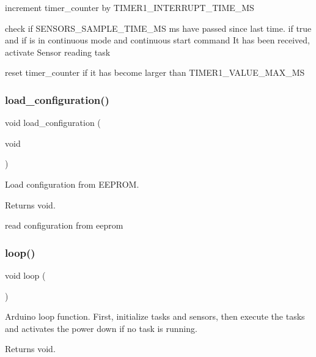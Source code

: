 increment timer\+\_\+counter by T\+I\+M\+E\+R1\+\_\+\+I\+N\+T\+E\+R\+R\+U\+P\+T\+\_\+\+T\+I\+M\+E\+\_\+\+MS

check if S\+E\+N\+S\+O\+R\+S\+\_\+\+S\+A\+M\+P\+L\+E\+\_\+\+T\+I\+M\+E\+\_\+\+MS ms have passed since last time. if true and if is in continuous mode and continuous start command It has been received, activate Sensor reading task

reset timer\+\_\+counter if it has become larger than T\+I\+M\+E\+R1\+\_\+\+V\+A\+L\+U\+E\+\_\+\+M\+A\+X\+\_\+\+MS \mbox{\label{i2c-th_8ino_a32a64a2800c724fb28e10636f2ec20b9}} 
\subsubsection{\texorpdfstring{load\+\_\+configuration()}{load\_configuration()}}
{\footnotesize\ttfamily void load\+\_\+configuration (\begin{DoxyParamCaption}\item[{void}]{ }\end{DoxyParamCaption})}



Load configuration from E\+E\+P\+R\+OM. 

\begin{DoxyReturn}{Returns}
void. 
\end{DoxyReturn}
read configuration from eeprom \mbox{\label{i2c-th_8ino_afe461d27b9c48d5921c00d521181f12f}} 
\subsubsection{\texorpdfstring{loop()}{loop()}}
{\footnotesize\ttfamily void loop (\begin{DoxyParamCaption}{ }\end{DoxyParamCaption})}



Arduino loop function. First, initialize tasks and sensors, then execute the tasks and activates the power down if no task is running. 

\begin{DoxyReturn}{Returns}
void. 
\end{DoxyReturn}
\mbox{\label{i2c-th_8ino_a1c5769e114267b210fb3812064d01dd0}} 
